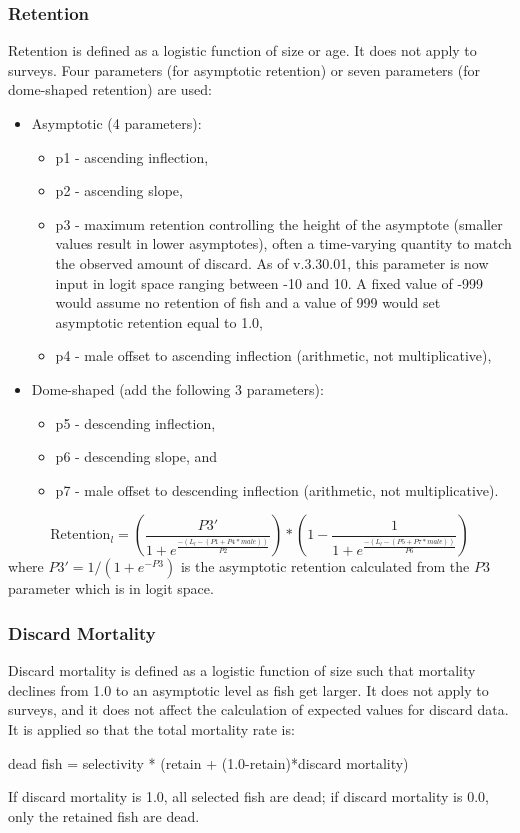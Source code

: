 \subsubsection{Retention}
Retention is defined as a logistic function of size or age. It does not apply to surveys. Four parameters (for asymptotic retention) or seven parameters (for dome-shaped retention) are used:
\begin{itemize}
	\item Asymptotic (4 parameters):
	\begin{itemize}
		\item p1 - ascending inflection,
		\item p2 - ascending slope,
		\item p3 - maximum retention controlling the height of the asymptote (smaller values result in lower asymptotes), often a time-varying quantity to match the observed amount of discard. As of v.3.30.01, this parameter is now input in logit space ranging between -10 and 10. A fixed value of -999 would assume no retention of fish and a value of 999 would set asymptotic retention equal to 1.0,
		\item p4 - male offset to ascending inflection (arithmetic, not multiplicative),
	\end{itemize}
	\item Dome-shaped (add the following 3 parameters):
	\begin{itemize}
		\item p5 - descending inflection,
		\item p6 - descending slope, and
		\item p7 - male offset to descending inflection (arithmetic, not multiplicative).
	\end{itemize}
\end{itemize}

\begin{equation}
	\text{Retention}_l = \left(\frac{P3'}{1 + e^{\frac{-(L_l-(P1+P4*male))}{P2}}}\right)*\left(1 - \frac{1}{1 + e^{\frac{-(L_l-(P5+P7*male))}{P6}}}\right)
\end{equation}
where $P3' = 1/(1+e^{-P3})$ is the asymptotic retention calculated from the $P3$ parameter which is in logit space.

\subsubsection{Discard Mortality}
Discard mortality is defined as a logistic function of size such that mortality declines from 1.0 to an asymptotic level as fish get larger. It does not apply to surveys, and it does not affect the calculation of expected values for discard data. It is applied so that the total mortality rate is:
\begin{center}
	dead fish = selectivity * (retain + (1.0-retain)*discard mortality)
\end{center}
If discard mortality is 1.0, all selected fish are dead; if discard mortality is 0.0, only the retained fish are dead.

